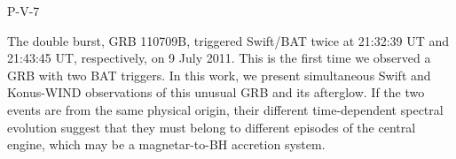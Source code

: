 P-V-7


\bigskip



\bigskip

\noindent The double burst, GRB 110709B, triggered Swift/BAT twice at 21:32:39 UT and
21:43:45 UT, respectively, on 9 July 2011. This is the first time we observed a
GRB with two BAT triggers. In this work, we present simultaneous Swift and
Konus-WIND observations of this unusual GRB and its afterglow. If the two
events are from the same physical origin, their different time-dependent
spectral evolution suggest that they must belong to different episodes of the
central engine, which may be a magnetar-to-BH accretion system.
